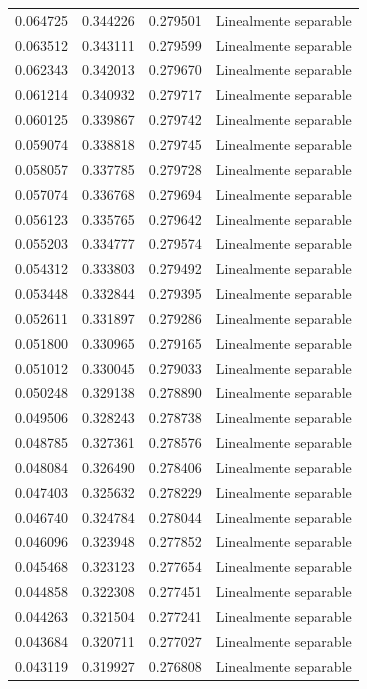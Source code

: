 \begin{tabular}{llll}
0.064725 & 0.344226 & 0.279501 & Linealmente separable \\
0.063512 & 0.343111 & 0.279599 & Linealmente separable \\
0.062343 & 0.342013 & 0.279670 & Linealmente separable \\
0.061214 & 0.340932 & 0.279717 & Linealmente separable \\
0.060125 & 0.339867 & 0.279742 & Linealmente separable \\
0.059074 & 0.338818 & 0.279745 & Linealmente separable \\
0.058057 & 0.337785 & 0.279728 & Linealmente separable \\
0.057074 & 0.336768 & 0.279694 & Linealmente separable \\
0.056123 & 0.335765 & 0.279642 & Linealmente separable \\
0.055203 & 0.334777 & 0.279574 & Linealmente separable \\
0.054312 & 0.333803 & 0.279492 & Linealmente separable \\
0.053448 & 0.332844 & 0.279395 & Linealmente separable \\
0.052611 & 0.331897 & 0.279286 & Linealmente separable \\
0.051800 & 0.330965 & 0.279165 & Linealmente separable \\
0.051012 & 0.330045 & 0.279033 & Linealmente separable \\
0.050248 & 0.329138 & 0.278890 & Linealmente separable \\
0.049506 & 0.328243 & 0.278738 & Linealmente separable \\
0.048785 & 0.327361 & 0.278576 & Linealmente separable \\
0.048084 & 0.326490 & 0.278406 & Linealmente separable \\
0.047403 & 0.325632 & 0.278229 & Linealmente separable \\
0.046740 & 0.324784 & 0.278044 & Linealmente separable \\
0.046096 & 0.323948 & 0.277852 & Linealmente separable \\
0.045468 & 0.323123 & 0.277654 & Linealmente separable \\
0.044858 & 0.322308 & 0.277451 & Linealmente separable \\
0.044263 & 0.321504 & 0.277241 & Linealmente separable \\
0.043684 & 0.320711 & 0.277027 & Linealmente separable \\
0.043119 & 0.319927 & 0.276808 & Linealmente separable \\

\end{tabular}
